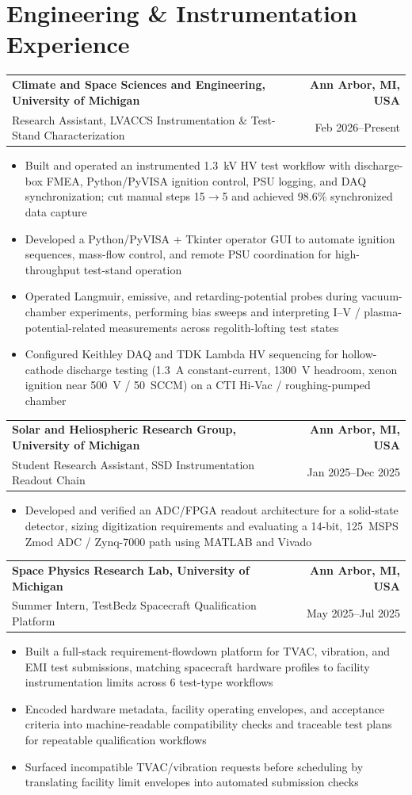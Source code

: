\documentclass[10pt,a4paper]{article}
\makeatletter
\newcommand{\resumeSubheading}[4]{%
  \par\noindent\begin{tabular*}{\textwidth}{@{\extracolsep{\fill}}l r}
    \textbf{#1} & \textcolor{nameblue}{\textbf{#2}} \\
    #3 & #4
  \end{tabular*}\par\vspace{-1.6pt}%
}
\newcommand{\resumeItemsStart}{\begin{itemize}}
\newcommand{\resumeItemsEnd}{\end{itemize}\vspace{-1.1pt}}
\newcommand{\resumeItem}[1]{\item #1}
\makeatother
\begin{document}
\section{Engineering \& Instrumentation Experience}

\resumeSubheading
  {Climate and Space Sciences and Engineering, University of Michigan}{Ann Arbor, MI, USA}
  {Research Assistant, LVACCS Instrumentation \& Test-Stand Characterization}{Feb 2026--Present}
\resumeItemsStart
  \resumeItem{Built and operated an instrumented 1.3~kV HV test workflow with discharge-box FMEA, Python/PyVISA ignition control, PSU logging, and DAQ synchronization; cut manual steps 15$\rightarrow$5 and achieved 98.6\% synchronized data capture}
  \resumeItem{Developed a Python/PyVISA + Tkinter operator GUI to automate ignition sequences, mass-flow control, and remote PSU coordination for high-throughput test-stand operation}
  \resumeItem{Operated Langmuir, emissive, and retarding-potential probes during vacuum-chamber experiments, performing bias sweeps and interpreting I--V / plasma-potential-related measurements across regolith-lofting test states}
  \resumeItem{Configured Keithley DAQ and TDK Lambda HV sequencing for hollow-cathode discharge testing (1.3~A constant-current, 1300~V headroom, xenon ignition near 500~V / 50~SCCM) on a CTI Hi-Vac / roughing-pumped chamber}
\resumeItemsEnd

\resumeSubheading
  {Solar and Heliospheric Research Group, University of Michigan}{Ann Arbor, MI, USA}
  {Student Research Assistant, SSD Instrumentation Readout Chain}{Jan 2025--Dec 2025}
\resumeItemsStart
  \resumeItem{Developed and verified an ADC/FPGA readout architecture for a solid-state detector, sizing digitization requirements and evaluating a 14-bit, 125~MSPS Zmod ADC / Zynq-7000 path using MATLAB and Vivado}
\resumeItemsEnd

\resumeSubheading
  {Space Physics Research Lab, University of Michigan}{Ann Arbor, MI, USA}
  {Summer Intern, TestBedz Spacecraft Qualification Platform}{May 2025--Jul 2025}
\resumeItemsStart
  \resumeItem{Built a full-stack requirement-flowdown platform for TVAC, vibration, and EMI test submissions, matching spacecraft hardware profiles to facility instrumentation limits across 6 test-type workflows}
  \resumeItem{Encoded hardware metadata, facility operating envelopes, and acceptance criteria into machine-readable compatibility checks and traceable test plans for repeatable qualification workflows}
  \resumeItem{Surfaced incompatible TVAC/vibration requests before scheduling by translating facility limit envelopes into automated submission checks}
\resumeItemsEnd
\end{document}
